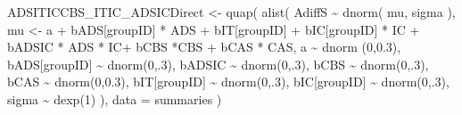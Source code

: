 \documentclass[
  10pt,
  dvipsnames,enabledeprecatedfontcommands]{scrartcl}
\newenvironment{Shaded}{\begin{snugshade}}{\end{snugshade}}
\newcommand{\AttributeTok}[1]{\textcolor[rgb]{0.77,0.63,0.00}{#1}}
\newcommand{\DecValTok}[1]{\textcolor[rgb]{0.00,0.00,0.81}{#1}}
\newcommand{\FloatTok}[1]{\textcolor[rgb]{0.00,0.00,0.81}{#1}}
\newcommand{\FunctionTok}[1]{\textcolor[rgb]{0.00,0.00,0.00}{#1}}
\newcommand{\NormalTok}[1]{#1}
\newcommand{\OtherTok}[1]{\textcolor[rgb]{0.56,0.35,0.01}{#1}}
\newcommand{\SpecialCharTok}[1]{\textcolor[rgb]{0.00,0.00,0.00}{#1}}
\begin{document}
\begin{Shaded}
\begin{Highlighting}[]
\NormalTok{ADSITICCBS\_ITIC\_ADSICDirect }\OtherTok{\textless{}{-}} \FunctionTok{quap}\NormalTok{(}
  \FunctionTok{alist}\NormalTok{(}
\NormalTok{    AdiffS }\SpecialCharTok{\textasciitilde{}} \FunctionTok{dnorm}\NormalTok{( mu, sigma ),}
\NormalTok{    mu }\OtherTok{\textless{}{-}}\NormalTok{ a }\SpecialCharTok{+}\NormalTok{ bADS[groupID] }\SpecialCharTok{*}\NormalTok{ ADS }\SpecialCharTok{+}\NormalTok{  bIT[groupID] }\SpecialCharTok{+}\NormalTok{ bIC[groupID] }\SpecialCharTok{*}\NormalTok{ IC }\SpecialCharTok{+} 
\NormalTok{      bADSIC }\SpecialCharTok{*}\NormalTok{ ADS }\SpecialCharTok{*}\NormalTok{ IC}\SpecialCharTok{+}\NormalTok{ bCBS }\SpecialCharTok{*}\NormalTok{CBS }\SpecialCharTok{+}\NormalTok{ bCAS }\SpecialCharTok{*}\NormalTok{ CAS,}
\NormalTok{    a }\SpecialCharTok{\textasciitilde{}} \FunctionTok{dnorm}\NormalTok{ (}\DecValTok{0}\NormalTok{,}\FloatTok{0.3}\NormalTok{),}
\NormalTok{    bADS[groupID] }\SpecialCharTok{\textasciitilde{}} \FunctionTok{dnorm}\NormalTok{(}\DecValTok{0}\NormalTok{,.}\DecValTok{3}\NormalTok{),}
\NormalTok{    bADSIC }\SpecialCharTok{\textasciitilde{}} \FunctionTok{dnorm}\NormalTok{(}\DecValTok{0}\NormalTok{,.}\DecValTok{3}\NormalTok{),}
\NormalTok{    bCBS }\SpecialCharTok{\textasciitilde{}} \FunctionTok{dnorm}\NormalTok{(}\DecValTok{0}\NormalTok{,.}\DecValTok{3}\NormalTok{),}
\NormalTok{    bCAS }\SpecialCharTok{\textasciitilde{}} \FunctionTok{dnorm}\NormalTok{(}\DecValTok{0}\NormalTok{,}\FloatTok{0.3}\NormalTok{),}
\NormalTok{    bIT[groupID] }\SpecialCharTok{\textasciitilde{}} \FunctionTok{dnorm}\NormalTok{(}\DecValTok{0}\NormalTok{,.}\DecValTok{3}\NormalTok{),}
\NormalTok{    bIC[groupID] }\SpecialCharTok{\textasciitilde{}} \FunctionTok{dnorm}\NormalTok{(}\DecValTok{0}\NormalTok{,.}\DecValTok{3}\NormalTok{),}
\NormalTok{    sigma  }\SpecialCharTok{\textasciitilde{}} \FunctionTok{dexp}\NormalTok{(}\DecValTok{1}\NormalTok{)}
\NormalTok{  ), }
  \AttributeTok{data =}\NormalTok{ summaries}
\NormalTok{)}



\end{Highlighting}
\end{Shaded}
\end{document}
